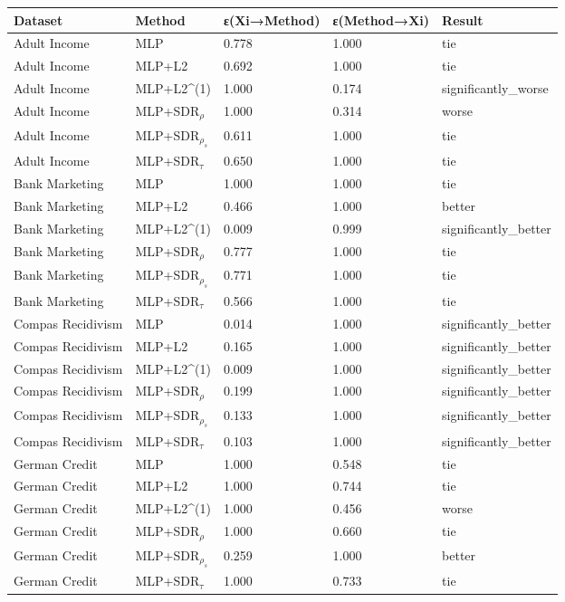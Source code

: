 \begin{tabular}{lllll}
\toprule
Dataset & Method & ε(Xi→Method) & ε(Method→Xi) & Result \\
\midrule
Adult Income & MLP & 0.778 & 1.000 & tie \\
Adult Income & MLP+L2 & 0.692 & 1.000 & tie \\
Adult Income & MLP+L2^{(1)} & 1.000 & 0.174 & significantly_worse \\
Adult Income & MLP+SDR$_{\rho}$ & 1.000 & 0.314 & worse \\
Adult Income & MLP+SDR$_{\rho_s}$ & 0.611 & 1.000 & tie \\
Adult Income & MLP+SDR$_{\tau}$ & 0.650 & 1.000 & tie \\
Bank Marketing & MLP & 1.000 & 1.000 & tie \\
Bank Marketing & MLP+L2 & 0.466 & 1.000 & better \\
Bank Marketing & MLP+L2^{(1)} & 0.009 & 0.999 & significantly_better \\
Bank Marketing & MLP+SDR$_{\rho}$ & 0.777 & 1.000 & tie \\
Bank Marketing & MLP+SDR$_{\rho_s}$ & 0.771 & 1.000 & tie \\
Bank Marketing & MLP+SDR$_{\tau}$ & 0.566 & 1.000 & tie \\
Compas Recidivism & MLP & 0.014 & 1.000 & significantly_better \\
Compas Recidivism & MLP+L2 & 0.165 & 1.000 & significantly_better \\
Compas Recidivism & MLP+L2^{(1)} & 0.009 & 1.000 & significantly_better \\
Compas Recidivism & MLP+SDR$_{\rho}$ & 0.199 & 1.000 & significantly_better \\
Compas Recidivism & MLP+SDR$_{\rho_s}$ & 0.133 & 1.000 & significantly_better \\
Compas Recidivism & MLP+SDR$_{\tau}$ & 0.103 & 1.000 & significantly_better \\
German Credit & MLP & 1.000 & 0.548 & tie \\
German Credit & MLP+L2 & 1.000 & 0.744 & tie \\
German Credit & MLP+L2^{(1)} & 1.000 & 0.456 & worse \\
German Credit & MLP+SDR$_{\rho}$ & 1.000 & 0.660 & tie \\
German Credit & MLP+SDR$_{\rho_s}$ & 0.259 & 1.000 & better \\
German Credit & MLP+SDR$_{\tau}$ & 1.000 & 0.733 & tie \\
\bottomrule
\end{tabular}
